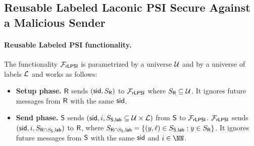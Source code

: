 \subsection{Reusable Labeled Laconic PSI Secure Against a Malicious Sender}
\label{subsec:lablpsi}




\paragraph{Reusable Labeled PSI functionality.}
The functionality $\mathcal{F}_{\mathsf{rLPSI}}$ is parametrized by a universe $\mathcal{U}$ and by a universe of labels $\mathcal{L}$ and works as follows:
\begin{itemize}
    \item \textbf{Setup phase.}
$\mathsf{R}$ sends $(\mathsf{sid},S_{\mathsf{R}})$ to  $\mathcal{F}_{\mathsf{rLPSI}}$ where $S_{\mathsf{R}}\subseteq \mathcal{U}$. It ignores future messages from $\mathsf{R}$ with the same $\mathsf{sid}$.


  \item \textbf{Send phase.}
  $\mathsf{S}$ sends $\left (\mathsf{sid},i,S_{\mathsf{S},\mathsf{lab}}\subseteq\mathcal{U} \times \mathcal{L}\right )$ from $\mathsf{S}$ to $\mathcal{F}_{\mathsf{rLPSI}}$. $\mathcal{F}_{\mathsf{rLPSI}}$ sends $(\mathsf{sid},i,S_{\mathsf{R}\cap S_{\mathsf{S}},\mathsf{lab}})$ to $\mathsf{R}$, where $S_{\mathsf{R}\cap S_{\mathsf{S}},\mathsf{lab}}=\{(y,\ell)\in S_{\mathsf{S},\mathsf{lab}}: y\in S_{\mathsf{R}}\}$. It  ignores future messages from $\mathsf{S}$ with the same $\mathsf{sid}$ and $i\in\NN$.
\end{itemize}


